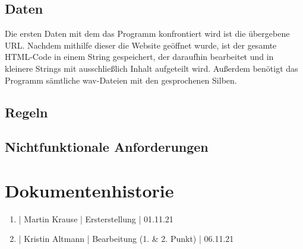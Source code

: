 \documentclass[11pt]{scrartcl}
\begin{document}
\subsection{Daten}

Die ersten Daten mit dem das Programm konfrontiert wird ist die übergebene URL. Nachdem mithilfe dieser
die Website geöffnet wurde, ist der gesamte HTML-Code in einem String gespeichert, der daraufhin bearbeitet
und in kleinere Strings mit ausschließlich Inhalt aufgeteilt wird. Außerdem benötigt das Programm sämtliche
wav-Dateien mit den gesprochenen Silben.

\subsection{Regeln}


\subsection{Nichtfunktionale Anforderungen}


\section{Dokumentenhistorie}

\begin{enumerate}
	\item | Martin Krause | Ersterstellung | 01.11.21
	\item | Kristin Altmann | Bearbeitung (1. & 2. Punkt) | 06.11.21
\end{enumerate}
 
\end{document}
